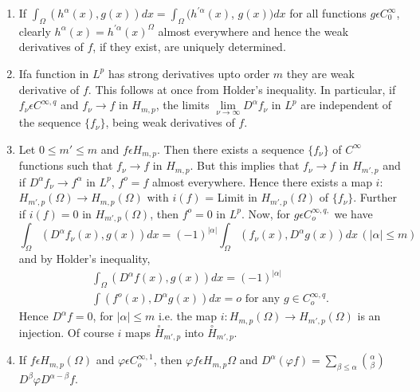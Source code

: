 \begin{remark*}%
  \begin{enumerate}[(1)]
  \item If $\int _\Omega(h^\alpha(x), g(x))  dx = \int
    _{\Omega}(h^{'\alpha}(x)$, $g(x))dx$ for all functions $g
    \epsilon C^{\infty}_{0}$, clearly $h^\alpha (x) = h^{'\alpha}(x)^{\Omega}$
    almost everywhere and hence the weak derivatives of $f$, if they
    exist, are uniquely determined. 
  \item If\pageoriginale a function in $L^p$ has strong derivatives upto order $m$
    they are weak derivative of $f$. This follows at once from
    Holder's inequality. In particular, if $f_{\nu} \epsilon
    C^{\infty,q}$ and $f_{\nu}\to f $ in $H_{m, p}$, the limits $
    \lim\limits_{\nu \to \infty} D^{\alpha}f_{\nu}$ in $L^{p}$ are
    independent of the sequence $\{f _{\nu}\} $, being weak
    derivatives of $f$. 
  \item Let $0 \le m' \le m$ and $f \epsilon H_{m,p}$. Then there
    exists a sequence $\{f _{\nu}\}$ of $C^{\infty}$ functions such
    that $f_{\nu}\to f $ in $H_{m,p}$. But this implies that
    $f_{\nu}\to f $ in $H_{m',p}$ and if $D^{\alpha}f_{\nu}\to
    f^{\alpha}$ in $L^{p}$, $f^{o}=f$ almost everywhere. Hence there
    exists a map $i$: $H_{m',p}(\Omega)\to H_{m,p}(\Omega)$ with $i(f)$
    = Limit in  
    $H_{m',p}(\Omega) $ of ${\{f_\nu}\}$. Further if $i (f) = 0$ in
    $H_{m',p} (\Omega)$, then $f^{o}=0$ in $L^{p}$. Now, for $g
    \epsilon C^{\infty, q,}_{o}$ we have  
    $$
    \int _{\Omega}(D^{\alpha}f_{\nu}(x),g(x)) dx = (-1)^{|\alpha|}
    \int _{\Omega}(f_{\nu}(x),D^{\alpha}g(x)) dx\, (| \alpha| \le m) 
    $$
    and by Holder's inequality,
    \begin{multline*}
      \int _{\Omega}(D^{\alpha}f (x),g(x)) dx =(-1)^{| \alpha |}\\ 
      \int (f^{o}(x), D^{\alpha}g(x)) dx =o  \text{ for any } g \in
      C^{\infty, q }_{o}. 
    \end{multline*}
    Hence  $D^{\alpha}f =0$, for $| \alpha |\le m$ i.e. the map $
    i:H_{m,p}(\Omega) \to H_{m',p}(\Omega)$ is an injection. Of course
    $i$ maps $ \overset{\circ}{H}_{m',p}$ into $\overset{\circ}{H}_{m',p}$. 
  \item If $f \epsilon H_{m,p}(\Omega)$ and $\varphi \epsilon C
    ^{\infty,1}_{o}$, then $\varphi f \epsilon H_{m,p}{\Omega}$ and
    $D^{\alpha}(\varphi f) = \sum _{\beta \le \alpha} \binom{\alpha}{\beta}$
    $D^{\beta}\varphi D^{\alpha-\beta}f $. 
  \end{enumerate}
\end{remark*}

